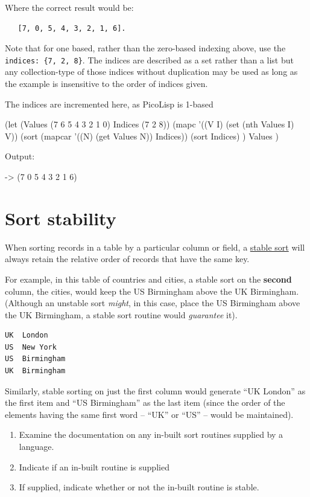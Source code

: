 Where the correct result would be:

\begin{verbatim}
   [7, 0, 5, 4, 3, 2, 1, 6].
\end{verbatim}

Note that for one based, rather than the zero-based indexing above, use
the \texttt{indices: \{7, 2, 8\}}. The indices are described as a set
rather than a list but any collection-type of those indices without
duplication may be used as long as the example is insensitive to the
order of indices given.

\begin{wideverbatim}

The indices are incremented here, as PicoLisp is 1-based

(let (Values (7 6 5 4 3 2 1 0)  Indices (7 2 8))
   (mapc
      '((V I) (set (nth Values I) V))
      (sort (mapcar '((N) (get Values N)) Indices))
      (sort Indices) )
   Values )

Output:

-> (7 0 5 4 3 2 1 6)

\end{wideverbatim}

\pagebreak{}
\section*{Sort stability}

When sorting records in a table by a particular column or field, a
\href{http://en.wikipedia.org/wiki/Stable\_sort\#Stability}{stable sort}
will always retain the relative order of records that have the same key.

For example, in this table of countries and cities, a stable sort on the
\textbf{second} column, the cities, would keep the US Birmingham above
the UK Birmingham. (Although an unstable sort \emph{might}, in this
case, place the US Birmingham above the UK Birmingham, a stable sort
routine would \emph{guarantee} it).

\begin{verbatim}
UK  London
US  New York
US  Birmingham
UK  Birmingham
\end{verbatim}

Similarly, stable sorting on just the first column would generate ``UK
London'' as the first item and ``US Birmingham'' as the last item (since
the order of the elements having the same first word -- ``UK'' or ``US''
-- would be maintained).

\begin{enumerate}
\item
  Examine the documentation on any in-built sort routines supplied by a
  language.
\item
  Indicate if an in-built routine is supplied
\item
  If supplied, indicate whether or not the in-built routine is stable.
\end{enumerate}

